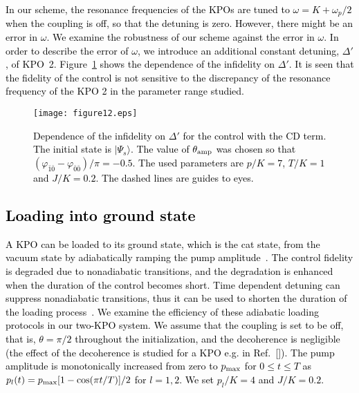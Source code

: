 \documentclass[%
 reprint,
 amsmath,amssymb,
 aps,
pra,
]{revtex4-2}
\begin{document}
\textcolor{black}{
In our scheme, the resonance frequencies of the KPOs are tuned to $\omega =  K + \omega_p/2$ when the coupling is off, so that the detuning is zero.
However, there might be an error in $\omega$.
We examine the robustness of our scheme against the error in $\omega$.
In order to describe the error of $\omega$, we introduce an additional constant detuning, $\Delta'$, of KPO~2. 
Figure~\ref{fid_Delta_KPO1_6_30_22} shows the dependence of the infidelity on $\Delta'$.
It is seen that the fidelity of the control is not sensitive to the discrepancy of the resonance frequency of the KPO 2 in the parameter range studied.
}
\begin{figure}[]
\begin{center}
\texttt{[image: figure12.eps]}
\end{center}
\caption{
\textcolor{black}{Dependence of the infidelity on $\Delta'$ for the control with the CD term.
The initial state is $|\Psi_s\rangle$.
The value of  $\theta_{\rm amp}$ was chosen so that  $(\varphi_{\bar{1}\bar{0}} - \varphi_{\bar{0}\bar{0}})/\pi=-0.5$.
The used parameters are $p/K=7$, $T/K=1$ and $J/K=0.2$.
The dashed lines are guides to eyes.}
}
\label{fid_Delta_KPO1_6_30_22}
\end{figure}


\textcolor{black}{
\section{Loading into ground state}
\label{Loading into ground state}
}
\textcolor{black}{
A KPO can be loaded to its ground state, which is the cat state, from the vacuum state by adiabatically ramping the pump amplitude~\cite{Cochrane1999,Goto2016}.
The control fidelity is degraded due to nonadiabatic transitions, and the degradation is enhanced when the duration of the control becomes short.
Time dependent detuning can suppress nonadiabatic transitions, thus it can be used to shorten the duration of the loading process~\cite{Goto_patent,Masuda2020}.
We examine the efficiency of these adiabatic loading protocols in our two-KPO system.
We assume that the coupling is set to be off, that is, $\theta=\pi/2$ throughout the initialization, and the decoherence is negligible (the effect of the decoherence is studied for a KPO e.g. in Ref.~[]).
The pump amplitude is monotonically increased from zero to $p_{\rm max}$ for $0\le t \le T$ as
$p_l(t)=p_{\rm max}[1 - \cos(\pi t/T) ] / 2$ for $l=1,2$. We set $p_l/K=4$ and $J/K=0.2$.
}
\end{document}

